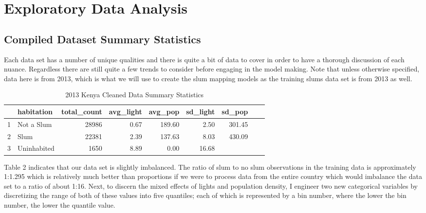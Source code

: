 \section{Exploratory Data Analysis}

\subsection{Compiled Dataset Summary Statistics}

Each data set has a number of unique qualities and there is quite a bit of data to cover in order to have a thorough discussion of each nuance. Regardless there are still quite a few trends to consider before engaging in the model making. Note that unless otherwise specified, data here is from 2013, which is what we will use to create the slum mapping models as the training slums data set is from 2013 as well.


\begin{table}[ht]
\centering
\caption{2013 Kenya Cleaned Data Summary Statistics}
\begin{tabular}{rlrrrrrrr}
  \hline \hline
 & habitation & total\_count & avg\_light & avg\_pop & sd\_light & sd\_pop\\ 
  \hline
1 & Not a Slum & 28986 & 0.67 & 189.60 & 2.50 & 301.45\\ 
  2 & Slum & 22381 & 2.39 & 137.63 & 8.03 & 430.09\\ 
  3 & Uninhabited & 1650 & 8.89 & 0.00 & 16.68\\ 
   \hline 
\end{tabular}
\end{table}

Table 2 indicates that our data set is slightly imbalanced. The ratio of slum to no slum observations in the training data is approximately 1:1.295 which is relatively much better than proportions if we were to process data from the entire country which would imbalance the data set to a ratio of about 1:16. Next, to discern the mixed effects of lights and population density, I engineer two new categorical variables by discretizing the range of both of these values into five quantiles; each of which is represented by a bin number, where the lower the bin number, the lower the quantile value. 

